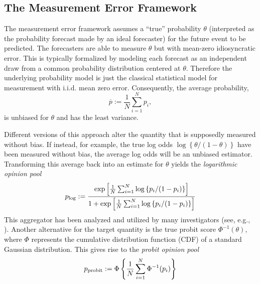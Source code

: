 \documentclass[11pt]{article}
\theoremstyle{definition}
\theoremstyle{definition}
\def\pb{\overline{p}}
\def\probit{p_{\rm probit}}
\def\plog{p_{\rm log}}
\begin{document}
%

\subsection{The Measurement Error Framework}
\label{ss:measurement}
The measurement error framework assumes a ``true'' probability
$\theta$ (interpreted as the probability forecast made by an ideal
forecaster) for the future event to be predicted.  The forecasters are able to measure
$\theta$ but with mean-zero idiosyncratic error.  This is typically
formalized by modeling each forecast as an independent draw from a common
probability distribution centered at $\theta$. Therefore the underlying probability model is just the 
classical statistical model for measurement with i.i.d. mean zero error.
Consequently, the average probability,
$$\pb := \frac{1}{N}\sum_{i=1}^N
p_i,$$
is unbiased for $\theta$ and has the least
variance.

Different versions of this approach alter the quantity that is supposedly
measured without bias. If instead, for example, the true log odds
$\log\left\{\theta/(1-\theta)\right\}$ have been measured without
bias, the average log odds will be an unbiased estimator. Transforming
this average back into an estimate for $\theta$ yields the {\em
logarithmic opinion pool}
$$\plog := \frac{\exp \left [ \frac{1}{N} \sum_{i=1}^N
   \log \left\{ p_i / (1-p_i) \right\} \right ]} {1 + \exp \left [
\frac{1}{N} \sum_{i=1}^N \log \left\{p_i / (1-p_i)\right\} \right
]} $$ This aggregator has been analyzed and utilized by many
investigators (see, e.g., \citealt{dawid1995coherent, Genest,
bacharach1975group}). Another alternative for the target quantity is
the true probit score $\Phi^{-1}(\theta)$, where $\Phi$ represents the
cumulative distribution function (CDF) of a standard Gaussian
distribution. This gives rise to the {\em probit opinion pool}
$$\probit := \Phi \left\{ \frac{1}{N} \sum_{i=1}^N \Phi^{-1}
   (p_i) \right \} $$
\end{document}
